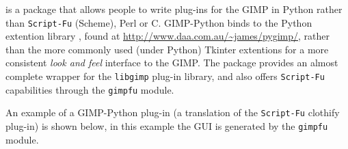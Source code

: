 \documentclass[twoside,11pt]{starlink}
\begin{document}
is a package that allows people to write plug-ins for the GIMP in
Python rather than \texttt{Script-Fu} (Scheme), Perl or C. GIMP-Python
binds to the  Python
extention library
,
found at \url{http://www.daa.com.au/~james/pygimp/}, rather than
the more commonly used (under Python) Tkinter extentions for a more
consistent \emph{look and feel} interface to the GIMP. The package
provides an almost complete wrapper for the \texttt{libgimp} plug-in
library, and also offers \texttt{Script-Fu} capabilities through the \texttt{gimpfu} module.

An example of a GIMP-Python plug-in (a translation of the \texttt{Script-Fu} clothify plug-in) is shown below, in this example the GUI
is generated by the \texttt{gimpfu} module.
\end{document}

